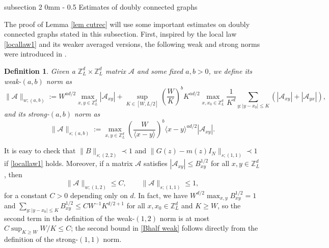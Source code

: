 \documentclass{article}
\makeatletter
\newcommand{\1}{\mathds{1}}
\numberwithin{equation}{section}
\newcommand{\be}{\begin{equation}}
\newcommand{\ee}{\end{equation}}
\renewcommand{\cal}{\mathcal}
\renewcommand{\leq}{\leqslant}
\renewcommand{\geq}{\geqslant}
\renewcommand{\le}{\leq}
\renewcommand{\ge}{\geq}
\newcommand{\Z}{\mathbb{Z}}
\theoremstyle{plain} %
\newtheorem{definition}[theorem]{Definition}
\theoremstyle{remark}
\renewcommand{\subsection}{\@startsection
	{subsection}%
	{2}%
	{0mm}%
	{-\baselineskip}%
	{0.5\baselineskip}%
	{\normalfont\bf\itshape}} %
\makeatother
\begin{document}
\subsection{Estimates of doubly connected graphs}\label{sec bound double}

The proof of Lemma \ref{lem cutrec} will use some important estimates on doubly connected graphs stated in this subsection. First,  inspired by the local law \eqref{locallaw1} and its weaker averaged versions, the following weak and strong norms were introduced in \cite{PartI_high}. %

\begin{definition}\label{Def PseudoG}
Given a $\Z_L^d\times \Z_L^d$ matrix $\cal A$ and some fixed $a,b>0$, we define its weak-$(a,b)$ norm as
$$\|\cal A\|_{w;(a,b)}:= W^{a d/2}\max_{x,y\in \Z_L^d} \left|\cal A_{xy}\right| + \sup_{ K \in [W, L/2]} \left( \frac{W}{K}\right)^b K^{ad/2} \max_{x, x_0\in \Z_L^d} \frac1{K^d}\sum_{y:| y - x_0 |\le K} \left(\left|\cal A_{xy}\right|+\left| \cal A_{yx}\right| \right),$$
and its strong-$(a,b)$ norm as
$$\|\cal A\|_{s;(a,b)}:= \max_{x,y\in \Z_L^d} \left( \frac{W}{\langle x-y\rangle}\right)^b \langle x-y\rangle^{ad/2} \left|\cal A_{xy}\right|.$$
\end{definition}

It is easy to check that $\|B\|_{s;(2,2)}\prec 1$ and $\|G(z)-m(z)I_N\|_{s;(1,1)}\prec 1$ if \eqref{locallaw1} holds. Moreover, if a matrix $\cal A$ satisfies $|\cal A_{xy}|\le B_{xy}^{1/2}$ for all $x,y\in\Z_L^d$, then 
\be\label{Bhalf weak}
\|\cal A\|_{w;(1,2)}\le C,\qquad \|\cal A\|_{s;(1,1)}\le 1,
\ee
for a constant $C>0$ depending only on $d$. In fact, we have $W^{d/2}\max_{x,y}B^{1/2}_{xy}=1$ and $\sum_{y:|y-x_0|\le K}B_{xy}^{1/2}\le CW^{-1}K^{d/2+1}$ for all $x,x_0\in \Z_L^d$ and $K\ge W$, so the second term in the definition of the weak-$(1,2)$ norm is at most $C\sup_{K\ge W}W/K\le C$; the second bound in \eqref{Bhalf weak} follows directly from the definition of the strong-$(1,1)$ norm.
\end{document}
